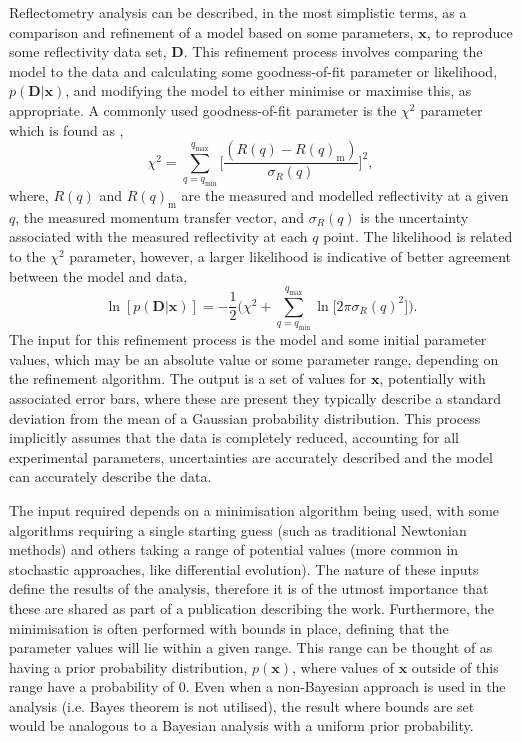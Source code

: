 \documentclass[reprint,superscriptaddress,aps,amsmath,linenumbers]{revtex4-2}
\begin{document}
Reflectometry analysis can be described, in the most simplistic terms, as a comparison and refinement of a model based on some parameters, $\mathbf{x}$, to reproduce some reflectivity data set, $\mathbf{D}$. 
This refinement process involves comparing the model to the data and calculating some goodness-of-fit parameter or likelihood, $p(\mathbf{D} | \mathbf{x})$, and modifying the model to either minimise or maximise this, as appropriate. 
A commonly used goodness-of-fit parameter is the $\chi^2$ parameter which is found as \cite{nelson_refnx_2019}, 
%
\begin{equation}
    \chi^2 = \sum_{q=q_{\text{min}}}^{q_{\text{max}}}{\bigg[\frac{(R(q) - R(q)_{\text{m}})}{\sigma_R(q)}\bigg]^2}, 
\end{equation}
%
where, $R(q)$ and $R(q)_{\text{m}}$ are the measured and modelled reflectivity at a given $q$, the measured momentum transfer vector, and $\sigma_R(q)$ is the uncertainty associated with the measured reflectivity at each $q$ point.
The likelihood is related to the $\chi^2$ parameter, however, a larger likelihood is indicative of better agreement between the model and data, 
%
\begin{equation}
    \ln[p(\mathbf{D} | \mathbf{x})] = -\frac{1}{2} \bigg(\chi^2 + \sum_{q=q_{\text{min}}}^{q_{\text{max}}}\ln{\big[2\pi\sigma_R(q)^2\big]}\bigg).
    \label{equ:likelihood}
\end{equation}
%
The input for this refinement process is the model and some initial parameter values, which may be an absolute value or some parameter range, depending on the refinement algorithm. 
The output is a set of values for $\mathbf{x}$, potentially with associated error bars, where these are present they typically describe a standard deviation from the mean of a Gaussian probability distribution. 
This process implicitly assumes that the data is completely reduced, accounting for all experimental parameters, uncertainties are accurately described and the model can accurately describe the data. 

The input required depends on a minimisation algorithm being used, with some algorithms requiring a single starting guess (such as traditional Newtonian methods) and others taking a range of potential values (more common in stochastic approaches, like differential evolution). 
The nature of these inputs define the results of the analysis, therefore it is of the utmost importance that these are shared as part of a publication describing the work. 
Furthermore, the minimisation is often performed with bounds in place, defining that the parameter values will lie within a given range. 
This range can be thought of as having a prior probability distribution, $p(\mathbf{x})$, where values of $\mathbf{x}$ outside of this range have a probability of \num{0}. 
Even when a non-Bayesian approach is used in the analysis (i.e. Bayes theorem is not utilised), the result where bounds are set would be analogous to a Bayesian analysis with a uniform prior probability. 
\end{document}

